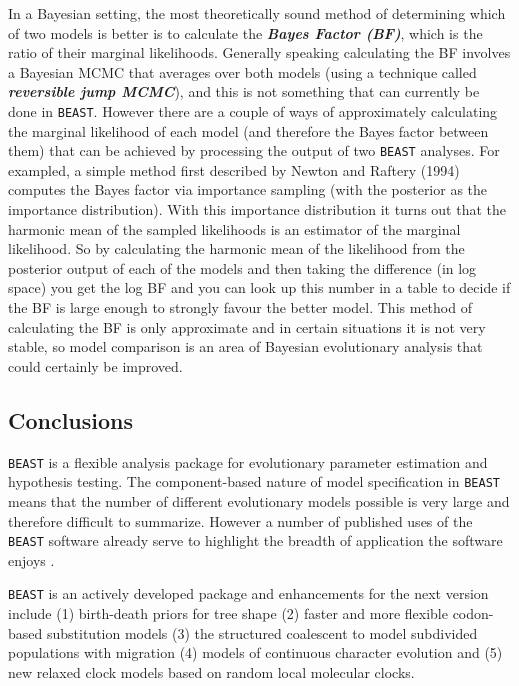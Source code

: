 \documentclass[cup7b, english]{cupbook}
\begin{document}
In a Bayesian setting, the most theoretically sound method of determining which of two models is better is to calculate 
the \textbf{\textit{Bayes Factor (BF)}}, which is the ratio of their marginal likelihoods. Generally speaking calculating the BF involves 
a Bayesian MCMC that averages over both models (using a technique called \textbf{\textit{reversible jump MCMC}}), and this is not something 
that can currently be done in \texttt{BEAST}. However there are a couple of ways of approximately calculating the marginal likelihood 
of each model (and therefore the Bayes factor between them) that can be achieved by processing the output of two \texttt{BEAST} 
analyses. For exampled, a simple method first described by Newton and Raftery (1994) computes the Bayes factor via 
importance sampling (with the posterior as the importance distribution). With this importance distribution it turns out 
that the harmonic mean of the sampled likelihoods is an estimator of the marginal likelihood. So by calculating the 
harmonic mean of the likelihood from the posterior output of each of the models and then taking the difference (in log 
space) you get the log BF and you can look up this number in a table to decide if the BF is large enough to strongly 
favour the better model. This method of calculating the BF is only approximate and in certain situations it is not 
very stable, so model comparison is an area of Bayesian evolutionary analysis that could certainly be improved.

\subsection{Conclusions}

\texttt{BEAST} is a flexible analysis package for evolutionary parameter estimation
and hypothesis testing. The component-based nature of model specification
in \texttt{BEAST} means that the number of different evolutionary models possible
is very large and therefore difficult to summarize. However a number
of published uses of the \texttt{BEAST} software already serve to highlight
the breadth of application the software enjoys \cite{PDNRR2003,Lemeyetal2004,Shapiroetal2004,DRSP2005,LMDJH2005}.

\texttt{BEAST} is an actively developed package and enhancements for the next
version include (1) birth-death priors for tree shape (2) faster and
more flexible codon-based substitution models (3) the structured coalescent
to model subdivided populations with migration (4) models of continuous
character evolution and (5) new relaxed clock models based on random local molecular clocks.
\end{document}
